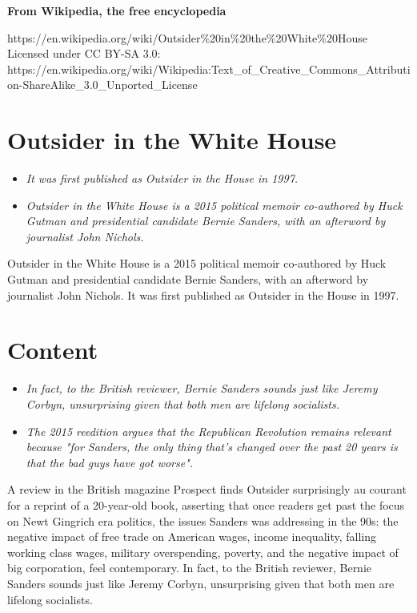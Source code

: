 \textbf{From Wikipedia, the free encyclopedia}

https://en.wikipedia.org/wiki/Outsider\%20in\%20the\%20White\%20House\\
Licensed under CC BY-SA 3.0:\\
https://en.wikipedia.org/wiki/Wikipedia:Text\_of\_Creative\_Commons\_Attribution-ShareAlike\_3.0\_Unported\_License

\section{Outsider in the White House}\label{outsider-in-the-white-house}

\begin{itemize}
\item
  \emph{It was first published as Outsider in the House in 1997.}
\item
  \emph{Outsider in the White House is a 2015 political memoir
  co-authored by Huck Gutman and presidential candidate Bernie Sanders,
  with an afterword by journalist John Nichols.}
\end{itemize}

Outsider in the White House is a 2015 political memoir co-authored by
Huck Gutman and presidential candidate Bernie Sanders, with an afterword
by journalist John Nichols. It was first published as Outsider in the
House in 1997.

\section{Content}\label{content}

\begin{itemize}
\item
  \emph{In fact, to the British reviewer, Bernie Sanders sounds just
  like Jeremy Corbyn, unsurprising given that both men are lifelong
  socialists.}
\item
  \emph{The 2015 reedition argues that the Republican Revolution remains
  relevant because "for Sanders, the only thing that's changed over the
  past 20 years is that the bad guys have got worse".}
\end{itemize}

A review in the British magazine Prospect finds Outsider surprisingly au
courant for a reprint of a 20-year-old book, asserting that once readers
get past the focus on Newt Gingrich era politics, the issues Sanders was
addressing in the 90s: the negative impact of free trade on American
wages, income inequality, falling working class wages, military
overspending, poverty, and the negative impact of big corporation, feel
contemporary. In fact, to the British reviewer, Bernie Sanders sounds
just like Jeremy Corbyn, unsurprising given that both men are lifelong
socialists.

